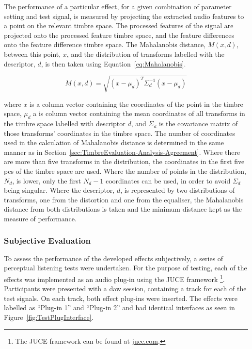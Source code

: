 			The performance of a particular effect, for a given combination of parameter setting and test
			signal, is measured by projecting the extracted audio features to a point on the relevant timbre
			space. The processed features of the signal are projected onto the processed feature timbre space,
			and the feature differences onto the feature difference timbre space. The Mahalanobis distance,
			$M(x, d)$, between this point, $x$, and the distribution of transforms labelled with the
			descriptor, $d$, is then taken using Equation~\ref{eq:Mahalanobis}.
			
			\begin{equation}
				M(x, d) = \sqrt{(x - \mu_{d})^{T}\Sigma_{d}^{-1}(x - \mu_{d})}
				\label{eq:Mahalanobis}
			\end{equation}

			where $x$ is a column vector containing the coordinates of the point in the timbre space, $\mu_{d}$
			a is column vector containing the mean coordinates of all transforms in the timbre space labelled
			with descriptor $d$, and $\Sigma_{d}$ is the covariance matrix of those transforms' coordinates in
			the timbre space. The number of coordinates used in the calculation of Mahalanobis distance is
			determined in the same manner as in Section~\ref{sec:TimbreEvaluation-Analysis-Agreement}. Where
			there are more than five transforms in the distribution, the coordinates in the first five
			\acrshort{pc}s of the timbre space are used. Where the number of points in the distribution,
			$N_{d}$, is lower, only the first $N_{d} - 1$ coordinates can be used, in order to avoid
			$\Sigma_{d}$ being singular. Where the descriptor, $d$, is represented by two distributions of
			transforms, one from the distortion and one from the equaliser, the Mahalanobis distance from both
			distributions is taken and the minimum distance kept as the measure of performance.
	
		\subsubsection*{Subjective Evaluation}
			To assess the performance of the developed effects subjectively, a series of perceptual listening
			tests were undertaken. For the purpose of testing, each of the effects was implemented as an audio
			plug-in using the JUCE framework \footnote{The JUCE framework can be found at
			\href{https://juce.com}{juce.com}.}. Participants were presented with a \acrshort{daw} session,
			containing a track for each of the test signals. On each track, both effect plug-ins were inserted.
			The effects were labelled as ``Plug-in 1'' and ``Plug-in 2'' and had identical interfaces as seen
			in Figure~\ref{fig:TestPlugInterface}.

